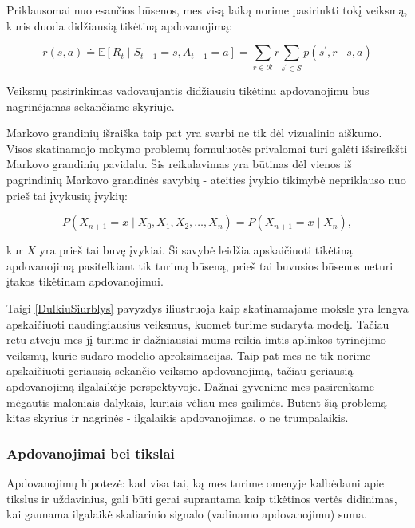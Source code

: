 \documentclass[a4paper, 12pt]{article}
\begin{document}
Priklausomai nuo esančios būsenos, mes visą laiką norime pasirinkti tokį veiksmą, kuris duoda didžiausią tikėtiną apdovanojimą:

\begin{equation}
r(s, a) \doteq \mathbb{E}\left[R_{t} \mid S_{t-1}=s, A_{t-1}=a\right]=\sum_{r \in \mathcal{R}} r \sum_{s^{\prime} \in \mathcal{S}} p\left(s^{\prime}, r \mid s, a\right)
\end{equation}

Veiksmų pasirinkimas vadovaujantis didžiausiu tikėtinu apdovanojimu bus nagrinėjamas sekančiame skyriuje.

Markovo grandinių išraiška taip pat yra svarbi ne tik dėl vizualinio aiškumo. Visos skatinamojo mokymo problemų formuluotės privalomai turi galėti išsireikšti Markovo grandinių pavidalu. Šis reikalavimas yra būtinas dėl vienos iš pagrindinių Markovo grandinės savybių - ateities įvykio tikimybė nepriklauso nuo prieš tai įvykusių įvykių:

\begin{equation}
P\left(X_{n+1}=x \mid X_{0}, X_{1}, X_{2}, \ldots, X_{n}\right)=P\left(X_{n+1}=x \mid X_{n}\right),
\end{equation}

kur $X$ yra prieš tai buvę įvykiai. Ši savybė leidžia apskaičiuoti tikėtiną apdovanojimą pasitelkiant tik turimą būseną, prieš tai buvusios būsenos neturi įtakos tikėtinam apdovanojimui.

Taigi \ref{DulkiuSiurblys} pavyzdys iliustruoja kaip skatinamajame moksle yra lengva apskaičiuoti naudingiausius veiksmus, kuomet turime sudaryta modelį. Tačiau retu atveju mes jį turime ir dažniausiai mums reikia imtis aplinkos tyrinėjimo veiksmų, kurie sudaro modelio aproksimacijas. Taip pat mes ne tik norime apskaičiuoti geriausią sekančio veiksmo apdovanojimą, tačiau geriausią apdovanojimą ilgalaikėje perspektyvoje. Dažnai gyvenime mes pasirenkame mėgautis maloniais dalykais, kuriais vėliau mes gailimės. Būtent šią problemą kitas skyrius ir nagrinės - ilgalaikis apdovanojimas, o ne trumpalaikis.

\subsubsection{Apdovanojimai bei tikslai}

Apdovanojimų hipotezė: kad visa tai, ką mes turime omenyje kalbėdami apie tikslus ir uždavinius, gali būti gerai suprantama kaip tikėtinos vertės didinimas, kai gaunama ilgalaikė skaliarinio signalo (vadinamo apdovanojimu) suma.
\end{document}
